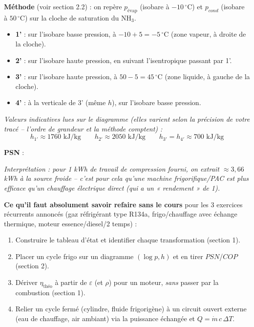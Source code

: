 \begin{correction}
\textbf{Méthode} (voir section 2.2) : on repère $p_{\text{évap}}$ (isobare à $-10\,^\circ$C) et $p_{cond}$ (isobare
à $50\,^\circ$C) sur la cloche de saturation du NH$_3$.
\begin{itemize}[leftmargin=1.4em]
\item \textbf{1'} : sur l'isobare basse pression, à $-10+5=-5\,^\circ$C (zone vapeur, à droite de la
cloche).
\item \textbf{2'} : sur l'isobare haute pression, en suivant l'isentropique passant par 1'.
\item \textbf{3'} : sur l'isobare haute pression, à $50-5=45\,^\circ$C (zone liquide, à gauche de la cloche).
\item \textbf{4'} : à la verticale de 3' (même $h$), sur l'isobare basse pression.
\end{itemize}

\emph{Valeurs indicatives lues sur le diagramme (elles varient selon la précision de votre tracé -- l'ordre
de grandeur et la méthode comptent) :}
\[h_{1'}\approx1760\text{ kJ/kg}\qquad h_{2'}\approx2050\text{ kJ/kg}\qquad
h_{3'}=h_{4'}\approx700\text{ kJ/kg}\]

\textbf{PSN} :

\emph{Interprétation : pour 1 kWh de travail de compression fourni, on extrait $\approx3{,}66$ kWh à la
source froide -- c'est pour cela qu'une machine frigorifique/PAC est plus efficace qu'un chauffage
électrique direct (qui a un « rendement » de 1).}
\end{correction}

\begin{methode}
\textbf{Ce qu'il faut absolument savoir refaire sans le cours} pour les 3 exercices récurrents annoncés
(gaz réfrigérant type R134a, frigo/chauffage avec échange thermique, moteur essence/diesel/2 temps) :
\begin{enumerate}[leftmargin=1.6em]
\item Construire le tableau d'état et identifier chaque transformation (section 1).
\item Placer un cycle frigo sur un diagramme $(\log p,h)$ et en tirer $PSN$/$COP$ (section 2).
\item Dériver $\eta_{\text{théo}}$ à partir de $\varepsilon$ (et $\rho$) pour un moteur, \emph{sans} passer par
la combustion (section 1).
\item Relier un cycle fermé (cylindre, fluide frigorigène) à un circuit ouvert externe (eau de chauffage,
air ambiant) via la puissance échangée et $Q=\dot m\,c\,\Delta T$.
\end{enumerate}
\end{methode}
